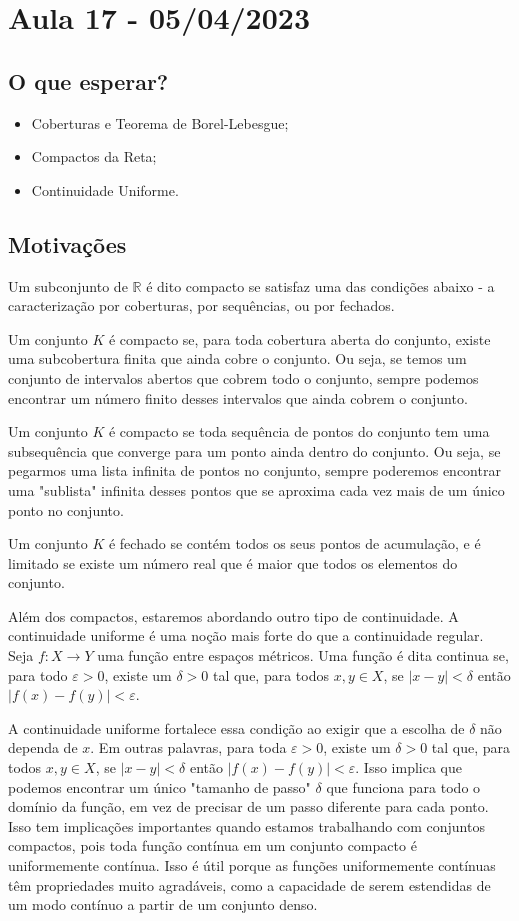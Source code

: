 \documentclass[Analysis/analysis_notes.tex]{subfiles}
\begin{document}
\section{Aula 17 - 05/04/2023}
\subsection{O que esperar?}
\begin{itemize}
	\item Coberturas e Teorema de Borel-Lebesgue;
	\item Compactos da Reta;
	\item Continuidade Uniforme.
\end{itemize}
\subsection{Motivações}
Um subconjunto de $\mathbb{R}$ é dito compacto se satisfaz uma das condições abaixo - a caracterização por coberturas, por sequências, ou
por fechados.

Um conjunto $K$ é compacto se, para toda cobertura aberta do conjunto, existe uma subcobertura finita que ainda cobre o conjunto.
Ou seja, se temos um conjunto de intervalos abertos que cobrem todo o conjunto, sempre podemos encontrar um número finito desses intervalos
que ainda cobrem o conjunto.

Um conjunto $K$ é compacto se toda sequência de pontos do conjunto tem uma subsequência que converge para um ponto ainda dentro
do conjunto. Ou seja, se pegarmos uma lista infinita de pontos no conjunto, sempre poderemos encontrar uma "sublista" infinita
desses pontos que se aproxima cada vez mais de um único ponto no conjunto.

Um conjunto $K$ é fechado se contém todos os seus pontos de acumulação, e é limitado se existe um número real que é maior que todos os elementos do conjunto.

Além dos compactos, estaremos abordando outro tipo de continuidade. A continuidade uniforme é uma noção mais forte do que a continuidade regular. Seja $f: X \rightarrow Y$ uma função entre espaços métricos. Uma função é dita continua se, para todo $\varepsilon > 0$, existe um $\delta > 0$ tal que, para todos $x, y \in X$, se $|x - y| < \delta$ então $|f(x) - f(y)| < \varepsilon$.

A continuidade uniforme fortalece essa condição ao exigir que a escolha de $\delta$ não dependa de $x$. Em outras palavras,
para toda $\varepsilon > 0$, existe um $\delta > 0$ tal que, para todos $x, y \in X$, se $|x - y| < \delta$ então
$|f(x) - f(y)| < \varepsilon$. Isso implica que podemos encontrar um único "tamanho de passo" $\delta$ que funciona para todo
o domínio da função, em vez de precisar de um passo diferente para cada ponto.
Isso tem implicações importantes quando estamos trabalhando com conjuntos compactos, pois toda função contínua em um
conjunto compacto é uniformemente contínua. Isso é útil porque as funções uniformemente contínuas têm propriedades muito agradáveis,
como a capacidade de serem estendidas de um modo contínuo a partir de um conjunto denso.
\end{document}
